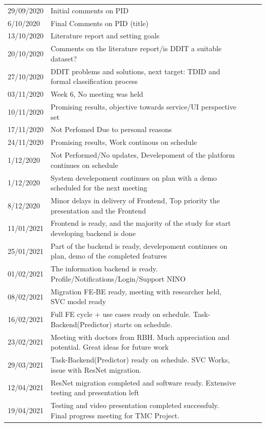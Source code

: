 \documentclass[a4paper,11pt,oneside]{book}
\begin{document}
	\begin{table}[H]
		\begin{tabular}{lllll}
			29/09/2020 & Initial comments on PID &  &  &  \\
			6/10/2020  & Final Comments on PID (title)&  &  &  \\
			13/10/2020 & Literature report and setting goals&  &  &  \\
			20/10/2020 & Comments on the literature report/is DDIT a suitable dataset?&  &  &  \\
			27/10/2020 & DDIT problems and solutions, next target: TDID and formal classification process&  &  &  \\
			03/11/2020 & Week 6, No meeting was held&  &  &  \\
			10/11/2020 & Promising results, objective towards service/UI perspective set&  &  &  \\
			17/11/2020 & Not Perfomed Due to personal reasons&  &  &  \\
			24/11/2020 & Promising results, Work continous on schedule&  &  &  \\				
			1/12/2020  & Not Performed/No updates, Develepoment of the platform continues on schedule&  &  &  \\				
			1/12/2020  & System develepoment continues on plan with a demo scheduled for the next meeting&  &  &  \\				
			8/12/2020  & Minor delays in delivery of Frontend, Top priority the presentation and the Frontend&  &  &  \\				
			11/01/2021 & Frontend is ready, and the majority of the study for start developing backend is done	&  &  &  \\				
			25/01/2021 & Part of the backend is ready, develepoment continues on plan, demo of the completed features	&  &  &  \\				
			01/02/2021 & The information backend is ready. Profile/Notifications/Login/Support NINO	&  &  &  \\		
			08/02/2021 & Migration FE-BE ready, meeting with researcher held, SVC model ready	&  &  &  \\	
			16/02/2021 & Full FE cycle + use cases ready on schedule. Task-Backend(Predictor) starts on schedule. 	&  &  &  \\	
			23/02/2021 & Meeting with doctors from RBH. Much appreciation and potential. Great ideas for future work 	&  &  &  \\		
			29/03/2021 & Task-Backend(Predictor) ready on schedule. SVC Works, issue with ResNet migration. 	&  &  &  \\	
			12/04/2021 & ResNet migration completed and software ready. Extensive testing and presentation left 	&  &  &  \\	
			19/04/2021 & Testing and video presentation completed successfuly. Final progress meeting for TMC Project. 	&  &  &  \\		
			
		\end{tabular}
	\end{table}
\end{document}
